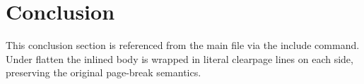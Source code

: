 \section{Conclusion}
This conclusion section is referenced from the main file via the include
command. Under flatten the inlined body is wrapped in literal clearpage
lines on each side, preserving the original page-break semantics.
